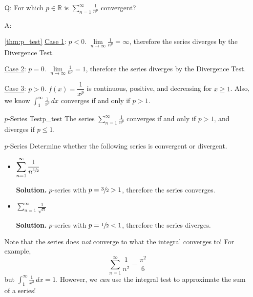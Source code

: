Q\@: For which $ p\in\mathbb{R} $ is $ \displaystyle \sum\limits_{n=1}^{\infty} \frac{1}{n^p} $
convergent?

A\@:
\begin{Proof}{\ref{thm:p_test}}{}
    \underline{Case 1}: $ p<0 $. $ \displaystyle \lim\limits_{{n} \to {\infty}} \frac{1}{n^p} =\infty $,
    therefore the series diverges by the Divergence Test.

    \underline{Case 2}: $ p=0 $. $ \displaystyle \lim\limits_{{n} \to {\infty}} \frac{1}{n^0} =1 $,
    therefore the series diverges by the Divergence Test.

    \underline{Case 3}: $ p>0 $. $ f(x)=\dfrac{1}{x^p} $ is continuous, positive, and decreasing
    for $ x\geqslant 1 $. Also, we know $ \displaystyle \int_{1}^{\infty} \frac{1}{x^p} \, d{x} $
    converges if and only if $ p>1 $.
\end{Proof}

\begin{Theorem}{$ p $-Series Test}{p_test}
    The series $ \displaystyle \sum\limits_{n=1}^{\infty} \frac{1}{n^p}  $ converges
    if and only if $ p>1 $, and diverges if $ p\leqslant 1 $.
\end{Theorem}

\begin{Example}{$ p $-Series}{}
    Determine whether the following series is convergent or divergent.
    \begin{itemize}
        \item $ \displaystyle \sum\limits_{n=1}^{\infty} \frac{1}{n^{\sfrac{3}{2} }} $

              \textbf{Solution.} $ p $-series with $ p=\sfrac{3}{2} >1 $,
              therefore the series converges.
        \item $ \displaystyle \sum\limits_{n=1}^{\infty} \frac{1}{\sqrt{n}} $

              \textbf{Solution.} $ p $-series with $ p=\sfrac{1}{2} <1 $, therefore the series
              diverges.
    \end{itemize}
\end{Example}

\begin{Remark}{}{}
    Note that the series does \emph{not} converge to what the integral converges to! For example,
    \[ \sum\limits_{n=1}^{\infty} \frac{1}{n^2} =\frac{\pi^2}{6} \]
    but $ \displaystyle \int_{1}^{\infty} \frac{1}{x^2} \, d{x}=1$.
    However, we \emph{can} use the integral
    test to approximate the sum of a series!
\end{Remark}

